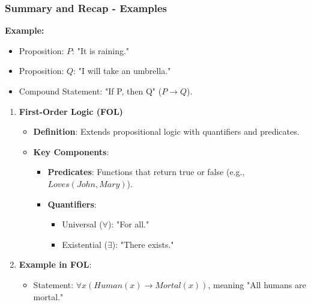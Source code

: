 \documentclass[aspectratio=169]{beamer}
\begin{document}
\begin{frame}[fragile]
    \frametitle{Summary and Recap - Examples}
    \textbf{Example:} 
    \begin{itemize}
        \item Proposition: $P$: "It is raining."
        \item Proposition: $Q$: "I will take an umbrella."
        \item Compound Statement: "If P, then Q" ($P \rightarrow Q$).
    \end{itemize}
    
    \begin{enumerate}
        \item \textbf{First-Order Logic (FOL)}
        \begin{itemize}
            \item \textbf{Definition}: Extends propositional logic with quantifiers and predicates.
            \item \textbf{Key Components}:
            \begin{itemize}
                \item \textbf{Predicates}: Functions that return true or false (e.g., $Loves(John, Mary)$).
                \item \textbf{Quantifiers}: 
                \begin{itemize}
                    \item Universal ($\forall$): "For all."
                    \item Existential ($\exists$): "There exists."
                \end{itemize}
            \end{itemize}
        \end{itemize}
        
        \item \textbf{Example in FOL}:
        \begin{itemize}
            \item Statement: $\forall x (Human(x) \rightarrow Mortal(x))$, meaning "All humans are mortal."
        \end{itemize}
    \end{enumerate}
\end{frame}
\end{document}
